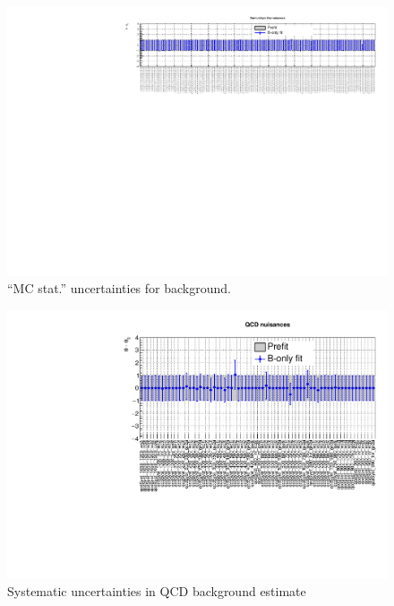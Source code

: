 \begin{figure}[h!]
  \centering
  \caption{``MC stat.'' uncertainties for \znunuj background.}
  \includegraphics[width=1.\linewidth]{figures/results/36invfb_freeze/postfit/nuis/FormulaSystZinv_nuisances}
\end{figure}

\clearpage
\begin{figure}[h!]
  \centering
  \caption{Systematic uncertainties in QCD background estimate}
  \includegraphics[width=1.\linewidth]{figures/results/36invfb_freeze/postfit/nuis/qcd_nuisances}
\end{figure}

